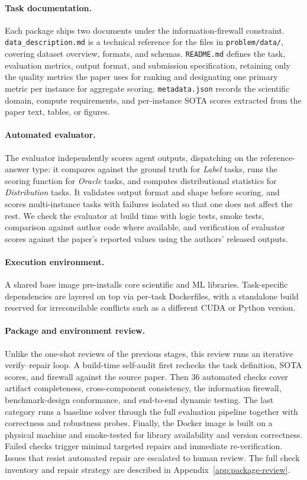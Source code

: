 \paragraph{Task documentation.}
Each package ships two documents under the information-firewall constraint. \texttt{data\_description.md} is a technical reference for the files in \texttt{problem/data/}, covering dataset overview, formats, and schemas. \texttt{README.md} defines the task, evaluation metrics, output format, and submission specification, retaining only the quality metrics the paper uses for ranking and designating one primary metric per instance for aggregate scoring.
\texttt{metadata.json} records the scientific domain, compute requirements, and per-instance SOTA scores extracted from the paper text, tables, or figures.

\paragraph{Automated evaluator.}
The evaluator independently scores agent outputs, dispatching on the reference-answer type: it compares against the ground truth for \emph{Label} tasks, runs the scoring function for \emph{Oracle} tasks, and computes distributional statistics for \emph{Distribution} tasks. It validates output format and shape before scoring, and scores multi-instance tasks with failures isolated so that one does not affect the rest. We check the evaluator at build time with logic tests, smoke tests, comparison against author code where available, and verification of evaluator scores against the paper's reported values using the authors' released outputs.

\paragraph{Execution environment.}
A shared base image pre-installs core scientific and ML libraries. Task-specific dependencies are layered on top via per-task Dockerfiles, with a standalone build reserved for irreconcilable conflicts such as a different CUDA or Python version.

\paragraph{Package and environment review.}
Unlike the one-shot reviews of the previous stages, this review runs an iterative verify--repair loop.
A build-time self-audit first rechecks the task definition, SOTA scores, and firewall against the source paper.
Then 36 automated checks cover artifact completeness, cross-component consistency, the information firewall, benchmark-design conformance, and end-to-end dynamic testing. The last category runs a baseline solver through the full evaluation pipeline together with correctness and robustness probes.
Finally, the Docker image is built on a physical machine and smoke-tested for library availability and version correctness.
Failed checks trigger minimal targeted repairs and immediate re-verification. Issues that resist automated repair are escalated to human review.
The full check inventory and repair strategy are described in Appendix~\ref{app:package-review}.


